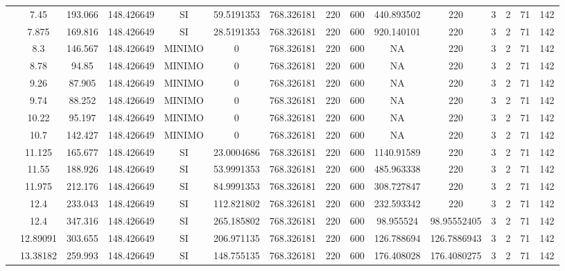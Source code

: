 \begin{table}[H]
{\begin{tabular}{|c|c|c|c|c|c|c|c|c|c|c|c|c|c|c|}
\cline{2-15}    & 7.45 & 193.066 & 148.426649 & SI  & 59.5191353 & 768.326181 & 220 & 600 & 440.893502 & 220 & 3   & 2   & 71  & 142 \bigstrut\\
\cline{2-15}    & 7.875 & 169.816 & 148.426649 & SI  & 28.5191353 & 768.326181 & 220 & 600 & 920.140101 & 220 & 3   & 2   & 71  & 142 \bigstrut\\
\cline{2-15}    & 8.3 & 146.567 & 148.426649 & MINIMO & 0   & 768.326181 & 220 & 600 & NA  & 220 & 3   & 2   & 71  & 142 \bigstrut\\
\cline{2-15}    & 8.78 & 94.85 & 148.426649 & MINIMO & 0   & 768.326181 & 220 & 600 & NA  & 220 & 3   & 2   & 71  & 142 \bigstrut\\
\cline{2-15}    & 9.26 & 87.905 & 148.426649 & MINIMO & 0   & 768.326181 & 220 & 600 & NA  & 220 & 3   & 2   & 71  & 142 \bigstrut\\
\cline{2-15}    & 9.74 & 88.252 & 148.426649 & MINIMO & 0   & 768.326181 & 220 & 600 & NA  & 220 & 3   & 2   & 71  & 142 \bigstrut\\
\cline{2-15}    & 10.22 & 95.197 & 148.426649 & MINIMO & 0   & 768.326181 & 220 & 600 & NA  & 220 & 3   & 2   & 71  & 142 \bigstrut\\
\cline{2-15}    & 10.7 & 142.427 & 148.426649 & MINIMO & 0   & 768.326181 & 220 & 600 & NA  & 220 & 3   & 2   & 71  & 142 \bigstrut\\
\cline{2-15}    & 11.125 & 165.677 & 148.426649 & SI  & 23.0004686 & 768.326181 & 220 & 600 & 1140.91589 & 220 & 3   & 2   & 71  & 142 \bigstrut\\
\cline{2-15}    & 11.55 & 188.926 & 148.426649 & SI  & 53.9991353 & 768.326181 & 220 & 600 & 485.963338 & 220 & 3   & 2   & 71  & 142 \bigstrut\\
\cline{2-15}    & 11.975 & 212.176 & 148.426649 & SI  & 84.9991353 & 768.326181 & 220 & 600 & 308.727847 & 220 & 3   & 2   & 71  & 142 \bigstrut\\
\cline{2-15}    & 12.4 & 233.043 & 148.426649 & SI  & 112.821802 & 768.326181 & 220 & 600 & 232.593342 & 220 & 3   & 2   & 71  & 142 \bigstrut\\
\cline{2-15}    & 12.4 & 347.316 & 148.426649 & SI  & 265.185802 & 768.326181 & 220 & 600 & 98.955524 & 98.95552405 & 3   & 2   & 71  & 142 \bigstrut\\
\cline{2-15}    & 12.89091 & 303.655 & 148.426649 & SI  & 206.971135 & 768.326181 & 220 & 600 & 126.788694 & 126.7886943 & 3   & 2   & 71  & 142 \bigstrut\\
\cline{2-15}    & 13.38182 & 259.993 & 148.426649 & SI  & 148.755135 & 768.326181 & 220 & 600 & 176.408028 & 176.4080275 & 3   & 2   & 71  & 142 \bigstrut\\

\end{tabular}}
\end{table}
